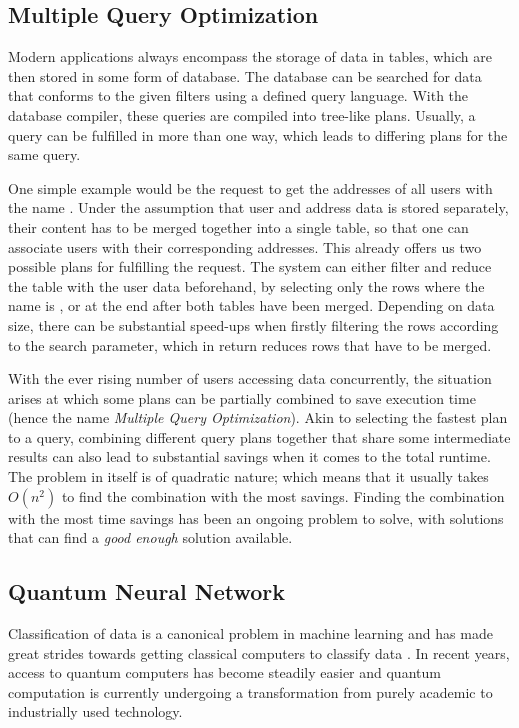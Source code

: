 \subsection{Multiple Query Optimization}
Modern applications always encompass the storage of data in tables, which are then stored in some form of database. The database can be searched for data that conforms to the given filters using a defined query language. With the database compiler, these queries are compiled into tree-like plans. Usually, a query can be fulfilled in more than one way, which leads to differing plans for the same query.\par
One simple example would be the request to get the addresses of all users with the name . Under the assumption that user and address data is stored separately, their content has to be merged together into a single table, so that one can associate users with their corresponding addresses. This already offers us two possible plans for fulfilling the request. The system can either filter and reduce the table with the user data beforehand, by selecting only the rows where the name is , or at the end after both tables have been merged. Depending on data size, there can be substantial speed-ups when firstly filtering the rows according to the search parameter, which in return reduces rows that have to be merged.\par 
With the ever rising number of users accessing data concurrently, the situation arises at which some plans can be partially combined to save execution time (hence the name \emph{Multiple Query Optimization}). Akin to selecting the fastest plan to a query, combining different query plans together that share some intermediate results can also lead to substantial savings when it comes to the total runtime. The problem in itself is of quadratic nature; which means that it usually takes $O(n^2)$ to find the combination with the most savings. Finding the combination with the most time savings has been an ongoing problem to solve, with solutions that can find a \emph{good enough} solution available. 

\subsection{Quantum Neural Network}
Classification of data is a canonical problem in machine learning and has made great strides towards getting classical computers to classify data \cite{Killoran_2019,ClassificationWithQNN}. In recent years, access to quantum computers has become steadily easier and quantum computation is currently undergoing a transformation from purely academic to industrially used technology\cite{schuldCircuitcentricQuantumClassifiers2020}.

